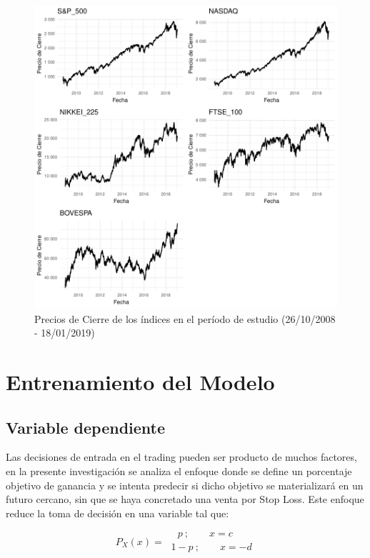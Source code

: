 \documentclass[a4paper,12pt]{Latex/Classes/PhDthesisPSnPDF}
\begin{document}


\begin{figure}[H]
\centering
\includegraphics{main-002}
\caption{Precios de Cierre de los índices en el período de estudio (26/10/2008 - 18/01/2019)}
\end{figure}

\section{Entrenamiento del Modelo}

\subsection{Variable dependiente}

Las decisiones de entrada en el trading pueden ser producto de muchos factores, en la presente investigación se analiza el enfoque donde se define un porcentaje objetivo de ganancia y se intenta predecir si dicho objetivo se materializará en un futuro cercano, sin que se haya concretado una venta por Stop Loss. Este enfoque reduce la toma de decisión en una variable tal que:

$$
P_{X}(x) = 
\begin{array}{ll} 
\ \ \ \ p \ ; \qquad x = c
\\
\ 1-p \ ; \qquad x = -d
\end{array}
$$
\end{document}
